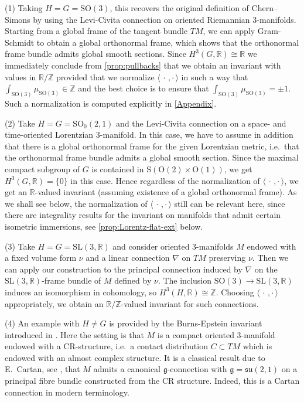 \documentclass[british,11pt,a4paper]{amsart}
\numberwithin{equation}{section}
\renewcommand\frak{\mathfrak}
\newcommand{\x}{\times}
\newcommand{\B}[2]{\langle#1,#2\rangle}
\newcommand{\Z}{\mathbb{Z}}
\newcommand*{\R}{\mathbb{R}}
\numberwithin{theorem}{section}
\theoremstyle{definition}
\theoremstyle{remark}
\begin{document}
(1) Taking $H=G=\mathrm{SO}(3)$, this recovers the original definition of Chern--Simons by using the Levi-Civita connection on oriented Riemannian $3$-manifolds. Starting from a global frame of the tangent bundle $TM$, we can apply Gram-Schmidt to obtain a global orthonormal frame, which shows that the orthonormal frame bundle admits global smooth sections. Since $H^3(G,\R)\cong\R$ we immediately conclude from \cref{prop:pullbacks} that we obtain an invariant with values in $\R/\Z$ provided that we normalize $\B{\,\cdot\,}{\cdot\,}$ in such a way that $\int_{\mathrm{SO}(3)}\mu_{\mathrm{SO}(3)}\in\Z$ and the best choice is to ensure that $\int_{\mathrm{SO}(3)}\mu_{\mathrm{SO}(3)}=\pm 1$. Such a normalization is computed explicitly in \cref{Appendix}.
  
\smallskip

(2) Take $H=G=\mathrm{SO}_0(2,1)$ and the Levi-Civita connection on a space- and time-oriented Lorentzian $3$-manifold. In this case, we have to assume in addition that there is a global orthonormal frame for the given Lorentzian metric, i.e.\ that the orthonormal frame bundle admits a global smooth section. Since the maximal compact subgroup of $G$ is contained in $\mathrm{S}(\mathrm{O}(2)\x \mathrm{O}(1))$, we get $H^3(G,\R)=\{0\}$ in this case. Hence regardless of the normalization of $\B{\,\cdot\,}{\cdot\,}$, we get an $\R$-valued invariant (assuming existence of a global orthonormal frame). As we shall see below, the normalization of $\B{\,\cdot\,}{\cdot\,}$ still can be relevant here, since there are integrality results for the invariant on manifolds that admit certain isometric immersions, see \cref{prop:Lorentz-flat-ext} below.

\smallskip

(3) Take $H=G=\mathrm{SL}(3,\R)$ and consider oriented $3$-manifolds $M$ endowed with  a fixed volume form $\nu$ and a linear connection $\nabla$ on $TM$ preserving $\nu$. Then we can apply our construction to the principal connection induced by $\nabla$ on the $\mathrm{SL}(3,\R)$-frame bundle of $M$ defined by $\nu$. The inclusion $\mathrm{SO}(3)\to \mathrm{SL}(3,\R)$ induces an isomorphism in cohomology, so $H^3(H,\R)\cong\Z$. Choosing $\B{\,\cdot\,}{\cdot\,}$ appropriately, we obtain an $\R/\Z$-valued invariant for such connections.

\smallskip

(4) An example with $H\neq G$ is provided by the Burns-Epstein invariant introduced in \cite{MR0936085}. Here the setting is that $M$ is a compact oriented $3$-manifold endowed with a CR-structure, i.e.\ a contact distribution $C\subset TM$ which is endowed with an almost complex structure. It is a classical result due to E.\ Cartan, see \cite{MR1556687}, that $M$ admits a canonical $\frak{g}$-connection with $\frak{g}=\frak{su}(2,1)$ on a principal fibre bundle constructed from the CR structure. Indeed, this is a Cartan connection in modern terminology.
\end{document}
